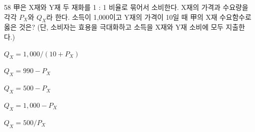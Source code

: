 \begin{question}{58}
甲은 X재와 Y재 두 재화를 1 : 1 비율로 묶어서 소비한다. X재의 가격과 수요량을 각각 $P_X$와 $Q_X$라 한다. 소득이 1,000이고 Y재의 가격이 10일 때 甲의 X재 수요함수로 옳은 것은? (단, 소비자는 효용을 극대화하고 소득을 X재와 Y재 소비에 모두 지출한다.)
\begin{choices}
  \item $Q_X = 1{,}000/(10 + P_X)$
  \item $Q_X = 990 - P_X$
  \item $Q_X = 500 - P_X$
  \item $Q_X = 1{,}000 - P_X$
  \item $Q_X = 500/P_X$
\end{choices}
\end{question}
